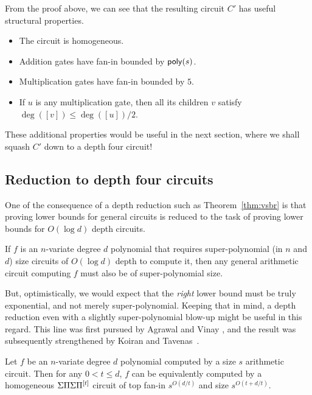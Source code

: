\begin{remark}\label{remark:vsbr}
From the proof above, we can see that the resulting circuit $C'$ has useful structural properties. 
\begin{itemize}
  \item The circuit is homogeneous. 
  \item Addition gates have fan-in bounded by $\mathsf{poly}(s)$. 
  \item Multiplication gates have fan-in bounded by $5$. 
  \item If $u$ is any multiplication gate, then all its children $v$ satisfy $\deg([v])\leq \deg([u])/2$. 
\end{itemize}
\end{remark}

These additional properties would be useful in the next section, where we shall squash $C'$ down to a depth four circuit!

\subsection{Reduction to depth four circuits}

One of the consequence of a depth reduction such as Theorem~\ref{thm:vsbr} is that proving lower bounds for general circuits is reduced to the task of proving lower bounds for $O(\log d)$ depth circuits. 

\begin{corollary}\label{cor:vsbr-contra}
If $f$ is an $n$-variate degree $d$ polynomial that requires super-polynomial (in $n$ and $d$) size circuits of $O(\log d)$ depth to compute it, then any general arithmetic circuit computing $f$ must also be of super-polynomial size. 
\end{corollary}

But, optimistically, we would expect that the \emph{right} lower bound must be truly exponential, and not merely super-polynomial. Keeping that in mind, a depth reduction even with a slightly super-polynomial blow-up might be useful in this regard. This line was first pursued by Agrawal and Vinay \cite{av08}, and the result was subsequently strengthened by Koiran \cite{koiran} and Tavenas~\cite{Tav13}. 

\begin{theorem} \label{thm:av}
Let $f$ be an $n$-variate degree $d$ polynomial computed by a size $s$ arithmetic circuit. Then for any $0< t \leq d$, $f$ can be equivalently computed by a homogeneous $\Sigma\Pi\Sigma\Pi^{[t]}$ circuit of top fan-in $s^{O(d/t)}$ and size $s^{O(t + d/t)}$. 
\end{theorem}

